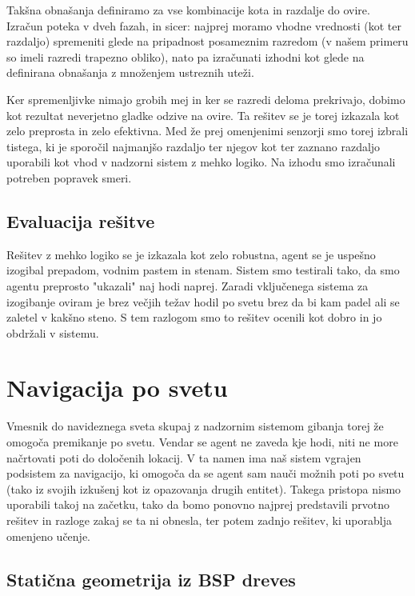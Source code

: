 \documentclass[a4paper,10pt]{article}
\begin{document}
Takšna obnašanja definiramo za vse kombinacije kota in razdalje do ovire. Izračun poteka v dveh fazah, in sicer: najprej moramo vhodne vrednosti (kot ter razdaljo) spremeniti glede na pripadnost posameznim razredom (v našem primeru so imeli razredi trapezno obliko), nato pa izračunati izhodni kot glede na definirana obnašanja z množenjem ustreznih uteži.

Ker spremenljivke nimajo grobih mej in ker se razredi deloma prekrivajo, dobimo kot rezultat neverjetno gladke odzive na ovire. Ta rešitev se je torej izkazala kot zelo preprosta in zelo efektivna. Med že prej omenjenimi senzorji smo torej izbrali tistega, ki je sporočil najmanjšo razdaljo ter njegov kot ter zaznano razdaljo uporabili kot vhod v nadzorni sistem z mehko logiko. Na izhodu smo izračunali potreben popravek smeri.

\subsection{Evaluacija rešitve}

Rešitev z mehko logiko se je izkazala kot zelo robustna, agent se je uspešno izogibal prepadom, vodnim pastem in stenam. Sistem smo testirali tako, da smo agentu preprosto "ukazali" naj hodi naprej. Zaradi vključenega sistema za izogibanje oviram je brez večjih težav hodil po svetu brez da bi kam padel ali se zaletel v kakšno steno. S tem razlogom smo to rešitev ocenili kot dobro in jo obdržali v sistemu.

\section{Navigacija po svetu} \label{sec:navigacija-po-svetu}

Vmesnik do navideznega sveta skupaj z nadzornim sistemom gibanja torej že omogoča premikanje po svetu. Vendar se agent ne zaveda kje hodi, niti ne more načrtovati poti do določenih lokacij. V ta namen ima naš sistem vgrajen podsistem za navigacijo, ki omogoča da se agent sam nauči možnih poti po svetu (tako iz svojih izkušenj kot iz opazovanja drugih entitet). Takega pristopa nismo uporabili takoj na začetku, tako da bomo ponovno najprej predstavili prvotno rešitev in razloge zakaj se ta ni obnesla, ter potem zadnjo rešitev, ki uporablja omenjeno učenje.

\subsection{Statična geometrija iz BSP dreves}
\end{document}
